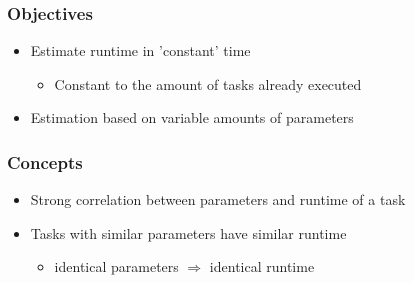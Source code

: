 

\begin{frame}
	\frametitle{Objectives}
		\begin{itemize}
			\item<2-> {Estimate runtime in 'constant' time}
				\begin{itemize}
					\item<3-> {Constant to the amount of tasks already executed}	
				\end{itemize}
				\item<4-> {Estimation based on variable amounts of parameters}
			\end{itemize}
\end{frame}		
		
\begin{frame} 
	\frametitle{Concepts}
		\begin{itemize}
			\item<2-> {Strong correlation between parameters and runtime of a task}
			\item<3-> {Tasks with similar parameters have similar runtime}
				\begin{itemize}
					\item<4-> {identical parameters $\Rightarrow$ identical runtime}	
				\end{itemize}	
		\end{itemize}
\end{frame}


